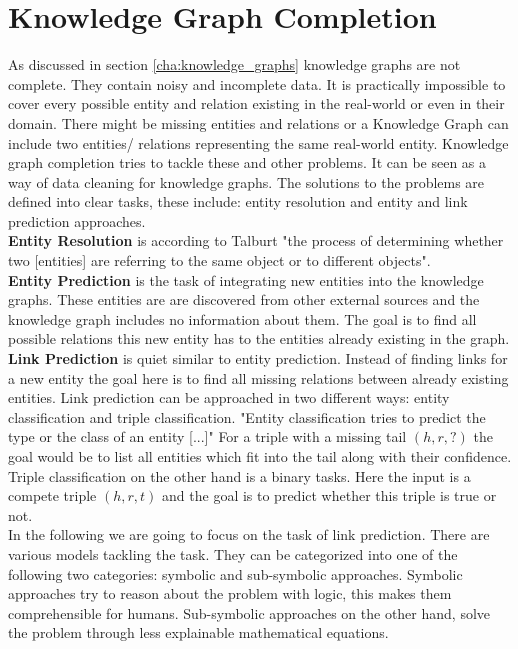 \chapter{Knowledge Graph Completion}
\label{cha:knowledge_graph_completion}

As discussed in section \ref{cha:knowledge_graphs} knowledge graphs are not complete. They contain noisy  and incomplete data. It is practically impossible to cover every possible entity and relation existing in the real-world or even in their domain. There might be missing entities and relations or a Knowledge Graph can include two entities/ relations representing the same real-world entity. Knowledge graph completion tries to tackle these and other problems. It can be seen as a way of data cleaning for knowledge graphs. The solutions to the problems are defined into clear tasks, these include: entity resolution and entity and link prediction approaches. \\

\textbf{Entity Resolution} is according to Talburt "the process of determining whether two [entities] are referring to the same object or to different objects". \cite{talburt_entity_2011} \\ 

\textbf{Entity Prediction} is the task of integrating new entities into the knowledge graphs. These entities are are discovered from other external sources and the knowledge graph includes no information about them. The goal is to find all possible relations this new entity has to the entities already existing in the graph. \cite[p.~1]{baumgartner_entity_2021} \\

\textbf{Link Prediction} is quiet similar to entity prediction. Instead of finding links for a new entity the goal here is to find all missing relations between already existing entities. \cite[p.~125]{golbeck_analyzing_2013} Link prediction can be approached in two different ways: entity classification and triple classification. "Entity classification tries to predict the type or the class of an entity [...]" \cite{ilkou_symbolic_2020} For a triple with a missing tail $(h,r,?)$ the goal would be to list all entities which fit into the tail along with their confidence. Triple classification on the other hand is a binary tasks. Here the input is a compete triple $(h,r,t)$ and the goal is to predict whether this triple is true or not. \cite{ilkou_symbolic_2020} \\

In the following we are going to focus on the task of link prediction. There are various models tackling the task. They can be categorized into one of the following two categories: symbolic and sub-symbolic approaches. Symbolic approaches try to reason about the problem with logic, this makes them comprehensible for humans. Sub-symbolic approaches on the other hand, solve the problem through less explainable mathematical equations. \cite{ilkou_symbolic_2020}

